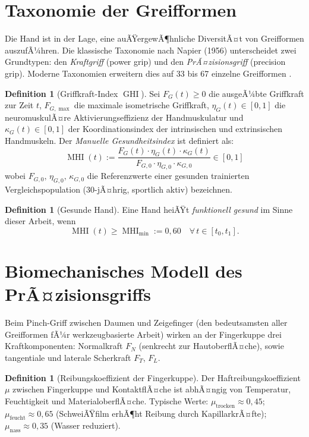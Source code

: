 ﻿\documentclass[12pt,a4paper]{report}
\theoremstyle{plain}
\theoremstyle{definition}
\newtheorem{definition}[theorem]{Definition}
\theoremstyle{remark}
\DeclareMathOperator{\MHI}{MHI}
\DeclareMathOperator{\GHI}{GHI}
\begin{document}
\section{Taxonomie der Greifformen}

Die Hand ist in der Lage, eine auÃŸergewÃ¶hnliche DiversitÃ¤t von Greifformen
auszufÃ¼hren. Die klassische Taxonomie nach Napier (1956) unterscheidet zwei
Grundtypen: den \emph{Kraftgriff} (power grip) und den \emph{PrÃ¤zisionsgriff}
(precision grip). Moderne Taxonomien erweitern dies auf 33 bis 67 einzelne
Greifformen \cite{feix2016}.

\begin{definition}[Griffkraft-Index $\GHI$]
\label{def:ghi}
Sei $F_G(t) \geq 0$ die ausgeÃ¼bte Griffkraft zur Zeit $t$,
$F_{G,\max}$ die maximale isometrische Griffkraft,
$\eta_G(t) \in [0,1]$ die neuromuskulÃ¤re Aktivierungseffizienz der
Handmuskulatur und $\kappa_G(t) \in [0,1]$ der Koordinationsindex der
intrinsischen und extrinsischen Handmuskeln. Der
\emph{Manuelle Gesundheitsindex} ist definiert als:
\[
  \MHI(t) := \frac{F_G(t) \cdot \eta_G(t) \cdot \kappa_G(t)}{F_{G,0} \cdot \eta_{G,0} \cdot \kappa_{G,0}}
  \in [0,1]
\]
wobei $F_{G,0},\, \eta_{G,0},\, \kappa_{G,0}$ die Referenzwerte einer gesunden
trainierten Vergleichspopulation (30-jÃ¤hrig, sportlich aktiv) bezeichnen.
\end{definition}

\begin{definition}[Gesunde Hand]
\label{def:gesunde_hand}
Eine Hand heiÃŸt \emph{funktionell gesund} im Sinne dieser Arbeit, wenn
\[
  \MHI(t) \geq \MHI_{\min} := 0{,}60 \quad \forall\, t \in [t_0, t_1].
\]
\end{definition}

\section{Biomechanisches Modell des PrÃ¤zisionsgriffs}

Beim Pinch-Griff zwischen Daumen und Zeigefinger (den bedeutsamsten aller
Greifformen fÃ¼r werkzeugbasierte Arbeit) wirken an der Fingerkuppe drei
Kraftkomponenten: Normalkraft $F_N$ (senkrecht zur HautoberflÃ¤che),
sowie tangentiale und laterale Scherkraft $F_T$, $F_L$.

\begin{definition}[Reibungskoeffizient der Fingerkuppe]
Der Haftreibungskoeffizient $\mu$ zwischen Fingerkuppe und KontaktflÃ¤che
ist abhÃ¤ngig von Temperatur, Feuchtigkeit und MaterialoberflÃ¤che.
Typische Werte: $\mu_{\text{trocken}} \approx 0{,}45$;
$\mu_{\text{feucht}} \approx 0{,}65$ (SchweiÃŸfilm erhÃ¶ht Reibung durch
KapillarkrÃ¤fte); $\mu_{\text{nass}} \approx 0{,}35$ (Wasser reduziert).
\end{definition}
\end{document}
